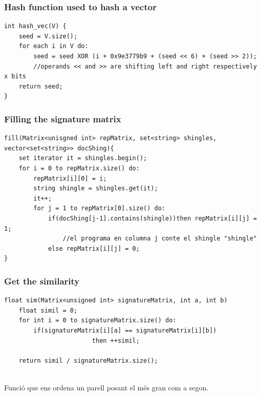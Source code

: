 \documentclass[12pt]{article}
\begin{document}
\subsubsection{Hash function used to hash a vector}
 \begin{lstlisting}
int hash_vec(V) {
	seed = V.size();
	for each i in V do:
		seed = seed XOR (i + 0x9e3779b9 + (seed << 6) + (seed >> 2));	
		//operands << and >> are shifting left and right respectively x bits
	return seed;
}
\end{lstlisting}
 \medskip 
  
\subsubsection{Filling the signature matrix}
\begin{lstlisting}
fill(Matrix<unisgned int> repMatrix, set<string> shingles, 
vector<set<string>> docShing){
	set iterator it = shingles.begin();	
	for i = 0 to repMatrix.size() do:
		repMatrix[i][0] = i;
		string shingle = shingles.get(it);
		it++; 
		for j = 1 to repMatrix[0].size() do:
			if(docShing[j-1].contains(shingle))then repMatrix[i][j] = 1;
				//el programa en columna j conte el shingle "shingle"
			else repMatrix[i][j] = 0;
}
\end{lstlisting}
\medskip

\subsubsection{Get the similarity}
\begin{lstlisting}
float sim(Matrix<unsigned int> signatureMatrix, int a, int b)
    float simil = 0;
    for int i = 0 to signatureMatrix.size() do:
        if(signatureMatrix[i][a] == signatureMatrix[i][b])
						then ++simil;
    
    return simil / signatureMatrix.size();


\end{lstlisting}

\begin{large}Funció que ens ordena un parell posant el més gran com a segon.
\end{large}
\end{document}
